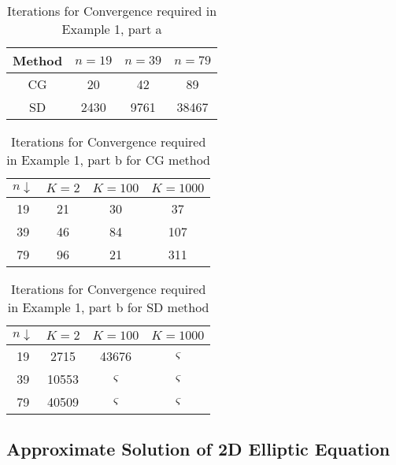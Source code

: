 \documentclass[11pt]{article}
\begin{document}
\begin{table}[!hbt]
\begin{center}
{\def\arraystretch{.95}
\begin{tabular}{|c|c|c|c|}
\hline
Method  & $n = 19$  &  $n = 39$  &  $n = 79$\\
\hline
CG & 20 & 42& 89\\ 
\hline
SD & 2430 & 9761 & 38467\\ 
\hline
\end{tabular}}
\end{center}
\caption{Iterations for Convergence required in Example 1, part a}
\end{table}
%
%
\begin{table}[!hbt]
\begin{center}
{\def\arraystretch{.95}
\begin{tabular}{|c|c|c|c|}
\hline
$n \downarrow$ & $K = 2$  &  $K = 100$  &  $K = 1000$\\
\hline
19 & 21 & 30& 37\\ 
\hline
39 & 46 & 84& 107\\ 
\hline
79 & 96 & 21& 311\\ 
\hline
\end{tabular}}
\end{center}
\caption{Iterations for Convergence required in Example 1, part b for CG method}
\end{table}
%
%
\begin{table}[!hbt]
\begin{center}
{\def\arraystretch{.95}
\begin{tabular}{|c|c|c|c|}
\hline
$n \downarrow$ & $K = 2$  &  $K = 100$  &  $K = 1000$\\
\hline
19 & 2715 & 43676 & $\varsigma$ \\ 
\hline
39 & 10553 & $\varsigma$ & $\varsigma$\\ 
\hline
79 & 40509 & $\varsigma$ & $\varsigma$\\ 
\hline
\end{tabular}}
\end{center}
\caption{Iterations for Convergence required in Example 1, part b for SD method  }
\end{table}

\subsection{Approximate Solution of 2D Elliptic Equation}
\end{document}

